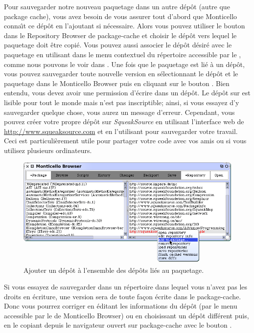 \documentclass[a4paper,10pt,twoside]{book}
\begin{document}
Pour sauvegarder notre nouveau paquetage dans un autre
d\'ep\^ot (autre que package cache), vous
avez besoin de vous assurer tout d'abord que Monticello conna\^{\i}t
ce d\'ep\^ot en l'ajoutant si n\'ecessaire.
Alors vous pouvez utiliser le bouton  dans le 
Repository Browser de package-cache et choisir le d\'ep\^ot vers lequel
le paquetage doit \^etre copi\'e.
Vous pouvez aussi associer le d\'ep\^ot d\'esir\'e avec le paquetage
en utilisant  
dans le menu contextuel du r\'epertoire accessible par le , comme
nous pouvons le voir dans .
Une fois que le paquetage est li\'e \`a un d\'ep\^ot, vous pouvez sauvegarder
toute nouvelle version en s\'electionnant le d\'ep\^ot et le paquetage
dans le Monticello Browser puis en cliquant sur le bouton 
 .  
Bien entendu, vous devez avoir une permission d'\'ecrire dans un d\'ep\^ot.
Le d\'ep\^ot  sur  est
lisible pour tout le monde mais n'est pas inscriptible; ainsi, si vous
essayez d'y sauvegarder quelque chose, vous aurez un message d'erreur.
Cependant, vous pouvez cr\'eer votre propre d\'ep\^ot sur 
\emph{SqueakSource} en utilisant l'interface web de \url{http://www.squeaksource.com} et en l'utilisant pour sauvegarder votre travail.
Ceci est particuli\`erement utile pour partager votre code avec vos amis ou
si vous utilisez plusieurs ordinateurs.

\begin{figure}[tbp]
	\begin{center}
		\includegraphics[width=\textwidth]{MCaddToPackage}
	\end{center}
	\caption{Ajouter un d\'ep\^ot \`a l'ensemble des d\'ep\^ots li\'es
au paquetage.}
	\label{fig:associateRepository}
\end{figure}

Si vous essayez de sauvegarder dans un r\'epertoire dans lequel vous n'avez
pas les droits en \'ecriture, une version sera de toute fa\c{c}on \'ecrite
dans le package-cache.
Donc vous pourrez corriger en \'editant les informations du d\'ep\^ot
(par le menu accessible par le  de Monticello Browser) ou
en choisissant un d\'ep\^ot diff\'erent puis, en le copiant
depuis le navigateur ouvert sur package-cache avec le bouton .
\end{document}
